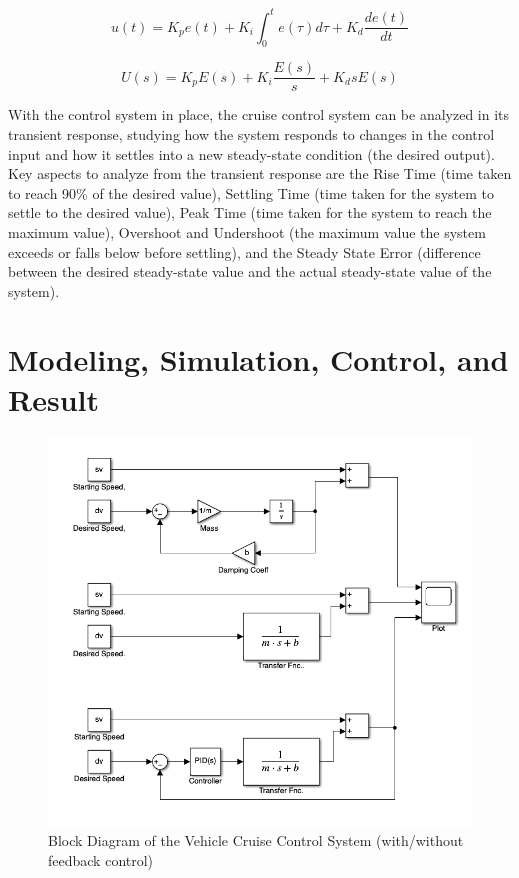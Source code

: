 \documentclass{article}
\begin{document}
\begin{equation}
    u(t) = K_p e(t) + K_i \int_0^t e(\tau) d\tau + K_d \frac{de(t)}{dt}
    \label{eq:pid}
\end{equation}

\begin{equation}
    U(s) = K_p E(s) + K_i \frac{E(s)}{s} + K_d s E(s)
    \label{eq:pidl}
\end{equation}

With the control system in place, the cruise control system can be analyzed in its transient response, studying how the system responds to changes in the control input and how it settles into a new steady-state condition (the desired output). Key aspects to analyze from the transient response are the Rise Time (time taken to reach 90\% of the desired value), Settling Time (time taken for the system to settle to the desired value), Peak Time (time taken for the system to reach the maximum value), Overshoot and Undershoot (the maximum value the system exceeds or falls below before settling), and the Steady State Error (difference between the desired steady-state value and the actual steady-state value of the system).

\section{Modeling, Simulation, Control, and Result}

\begin{figure}[H]
    \centering
    \includegraphics[width=0.8\linewidth]{img/block_diagram.png}
    \caption{Block Diagram of the Vehicle Cruise Control System (with/without feedback control)}
    \label{fig:block}
\end{figure}
\end{document}
